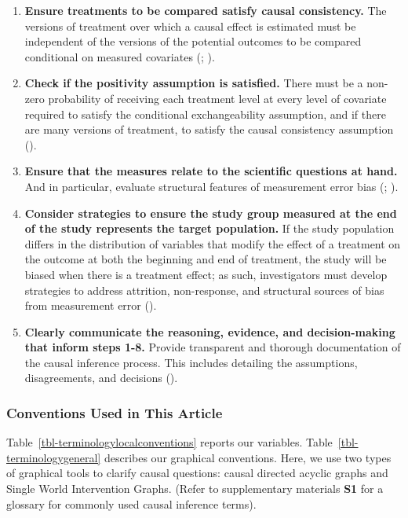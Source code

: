 \documentclass[
  single column]{article}
\begin{document}
\begin{enumerate}
  ).
\item
  \textbf{Ensure treatments to be compared satisfy causal consistency.}
  The versions of treatment over which a causal effect is estimated must
  be independent of the versions of the potential outcomes to be
  compared conditional on measured covariates
  (;
  ).
\item
  \textbf{Check if the positivity assumption is satisfied.} There must
  be a non-zero probability of receiving each treatment level at every
  level of covariate required to satisfy the conditional exchangeability
  assumption, and if there are many versions of treatment, to satisfy
  the causal consistency assumption
  ().
\item
  \textbf{Ensure that the measures relate to the scientific questions at
  hand.} And in particular, evaluate structural features of measurement
  error bias (;
  ).
\item
  \textbf{Consider strategies to ensure the study group measured at the
  end of the study represents the target population.} If the study
  population differs in the distribution of variables that modify the
  effect of a treatment on the outcome at both the beginning and end of
  treatment, the study will be biased when there is a treatment effect;
  as such, investigators must develop strategies to address attrition,
  non-response, and structural sources of bias from measurement error
  ().
\item
  \textbf{Clearly communicate the reasoning, evidence, and
  decision-making that inform steps 1-8.} Provide transparent and
  thorough documentation of the causal inference process. This includes
  detailing the assumptions, disagreements, and decisions
  ().
\end{enumerate}

\subsubsection{Conventions Used in This
Article}\label{conventions-used-in-this-article}

Table~\ref{tbl-terminologylocalconventions} reports our variables.
Table~\ref{tbl-terminologygeneral} describes our graphical conventions.
Here, we use two types of graphical tools to clarify causal questions:
causal directed acyclic graphs and Single World Intervention Graphs.
(Refer to supplementary materials \textbf{S1} for a glossary for
commonly used causal inference terms).
\end{document}
